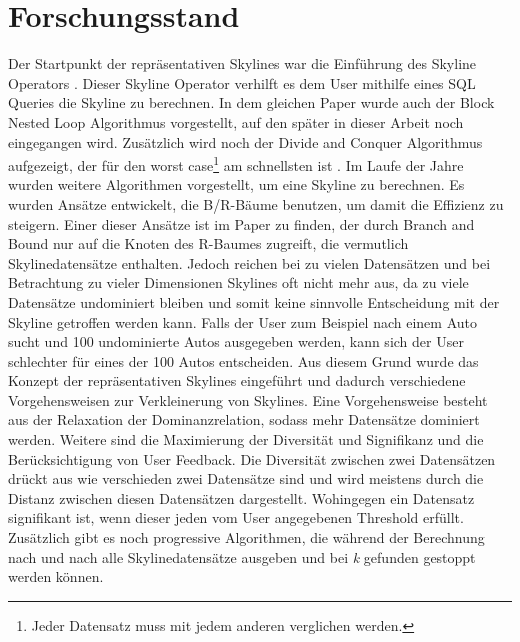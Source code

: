 \chapter{Forschungsstand}
\label{ch:Forschungsstand}
Der Startpunkt der repräsentativen Skylines war die Einführung des Skyline Operators \cite{borzsony2001skyline}. Dieser Skyline Operator verhilft es dem User mithilfe eines SQL Queries die Skyline zu berechnen. In dem gleichen Paper wurde auch der Block Nested Loop Algorithmus vorgestellt, auf den später in dieser Arbeit noch eingegangen wird. Zusätzlich wird noch der Divide and Conquer Algorithmus aufgezeigt, der für den worst case\footnote{Jeder Datensatz muss mit jedem anderen verglichen werden.} am schnellsten ist \cite[p. 435]{borzsony2001skyline}. Im Laufe der Jahre wurden weitere Algorithmen vorgestellt, um eine Skyline zu berechnen. Es wurden Ansätze entwickelt, die B/R-Bäume benutzen, um damit die Effizienz zu steigern. Einer dieser Ansätze ist im Paper \cite{Papadias:2003:OPA:872757.872814} zu finden, der durch Branch and Bound nur auf die Knoten des R-Baumes zugreift, die vermutlich Skylinedatensätze enthalten. 
Jedoch reichen bei zu vielen Datensätzen und bei Betrachtung zu vieler Dimensionen Skylines oft nicht mehr aus, da zu viele Datensätze undominiert bleiben und somit keine sinnvolle Entscheidung mit der Skyline getroffen werden kann. Falls der User zum Beispiel nach einem Auto sucht und 100 undominierte Autos ausgegeben werden, kann sich der User schlechter für eines der 100 Autos entscheiden.
Aus diesem Grund wurde das Konzept der repräsentativen Skylines eingeführt und dadurch verschiedene Vorgehensweisen zur Verkleinerung von Skylines. 
Eine Vorgehensweise besteht aus der Relaxation der Dominanzrelation, sodass mehr Datensätze dominiert werden. Weitere sind die Maximierung der Diversität und Signifikanz und die Berücksichtigung von User Feedback. Die Diversität zwischen zwei Datensätzen drückt aus wie verschieden zwei Datensätze sind und wird meistens durch die Distanz zwischen diesen Datensätzen dargestellt. Wohingegen ein Datensatz signifikant ist, wenn dieser jeden vom User angegebenen Threshold erfüllt. Zusätzlich gibt es noch progressive Algorithmen, die während der Berechnung nach und nach alle Skylinedatensätze ausgeben und bei \textit{k} gefunden gestoppt werden können.
